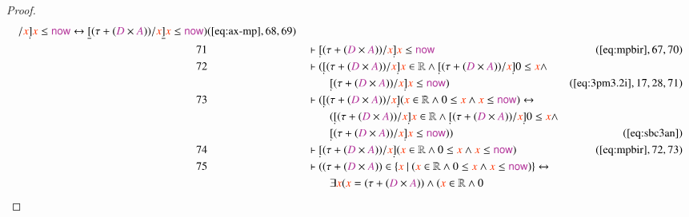 \begin{proof}
\begin{align}
      / \msc{x} \underaccent{\dot}{]} \msc{x} \le
      \mathsf{\mc{now}} \leftrightarrow \underline{[} (
      \tau + ( \mc{D} \times \mc{A} ) ) / \msc{x}
      \underline{]} \msc{x} \le \mathsf{\mc{now}}
      )&(\mbox{\ref{eq:ax-mp}},68,69)\notag
  \\ 71 &&  & \vdash \underaccent{\dot}{[} ( \tau + ( \mc{D} \times \mc{A} ) ) /
      \msc{x} \underaccent{\dot}{]} \msc{x} \le
      \mathsf{\mc{now}}&(\mbox{\ref{eq:mpbir}},67,70)\notag
  \\ 72 &&  & \vdash ( \underaccent{\dot}{[} ( \tau + ( \mc{D} \times \mc{A} ) )
      / \msc{x} \underaccent{\dot}{]} \msc{x} \in
      \mathbb{R} \wedge \underaccent{\dot}{[} ( \tau + (
      \mc{D} \times \mc{A} ) ) / \msc{x}
      \underaccent{\dot}{]} 0 \le \msc{x} \wedge \notag \\ & & & \qquad
      \underaccent{\dot}{[} ( \tau + ( \mc{D} \times \mc{A}
      ) ) / \msc{x} \underaccent{\dot}{]} \msc{x} \le
      \mathsf{\mc{now}}
      )&(\mbox{\ref{eq:3pm3.2i}},17,28,71)\notag
  \\ 73 &&  & \vdash ( \underaccent{\dot}{[} ( \tau + ( \mc{D} \times \mc{A} ) )
      / \msc{x} \underaccent{\dot}{]} ( \msc{x} \in
      \mathbb{R} \wedge 0 \le \msc{x} \wedge \msc{x} \le
      \mathsf{\mc{now}} ) \leftrightarrow  \notag \\ & & & \qquad
      (
      \underaccent{\dot}{[} ( \tau + ( \mc{D} \times \mc{A}
      ) ) / \msc{x} \underaccent{\dot}{]} \msc{x} \in
      \mathbb{R} \wedge \underaccent{\dot}{[} ( \tau + (
      \mc{D} \times \mc{A} ) ) / \msc{x}
      \underaccent{\dot}{]} 0 \le \msc{x} \wedge \notag \\ & & & \qquad
      \underaccent{\dot}{[} ( \tau + ( \mc{D} \times \mc{A}
      ) ) / \msc{x} \underaccent{\dot}{]} \msc{x} \le
      \mathsf{\mc{now}} ) )&(\mbox{\ref{eq:sbc3an}})\notag
  \\ 74 &&  & \vdash \underaccent{\dot}{[} ( \tau + ( \mc{D} \times \mc{A} ) ) /
      \msc{x} \underaccent{\dot}{]} ( \msc{x} \in
      \mathbb{R} \wedge 0 \le \msc{x} \wedge \msc{x} \le
      \mathsf{\mc{now}}
      )&(\mbox{\ref{eq:mpbir}},72,73)\notag
  \\ 75 &&  & \vdash ( ( \tau + ( \mc{D} \times \mc{A} ) ) \in \{ \msc{x}~\vert~(
      \msc{x} \in \mathbb{R} \wedge 0 \le \msc{x} \wedge
      \msc{x} \le \mathsf{\mc{now}} ) \} \leftrightarrow \notag \\ & & & \qquad
      \exists \msc{x} ( \msc{x} = ( \tau + ( \mc{D} \times
      \mc{A} ) ) \wedge ( \msc{x} \in \mathbb{R} \wedge 0

\end{align}
\end{proof}
